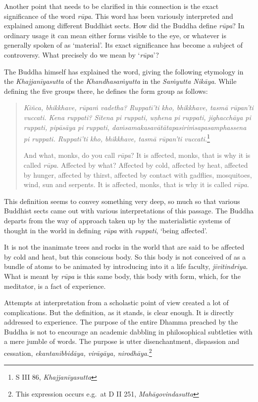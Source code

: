Another point that needs to be clarified in this connection is the exact significance of the word \emph{rūpa}. This word has been variously interpreted and explained among different Buddhist sects. How did the Buddha define \emph{rūpa}? In ordinary usage it can mean either forms visible to the eye, or whatever is generally spoken of as `material'. Its exact significance has become a subject of controversy. What precisely do we mean by `\emph{rūpa}'?

The Buddha himself has explained the word, giving the following etymology in the \emph{Khajjanīyasutta} of the \emph{Khandhasaṁyutta} in the \emph{Saṁyutta Nikāya}. While defining the five groups there, he defines the form group as follows:

\begin{quote}
\emph{Kiñca, bhikkhave, rūpaṁ vadetha? Ruppatī'ti kho, bhikkhave, tasmā rūpan'ti vuccati. Kena ruppati? Sītena pi ruppati, uṇhena pi ruppati, jighacchāya pi ruppati, pipāsāya pi ruppati, daṁsamakasavātātapasiriṁsapasamphassena pi ruppati. Ruppatī'ti kho, bhikkhave, tasmā rūpan'ti vuccati.}\footnote{S III 86, \emph{Khajjanīyasutta}}

And what, monks, do you call \emph{rūpa}? It is affected, monks, that is why it is called \emph{rūpa}. Affected by what? Affected by cold, affected by heat, affected by hunger, affected by thirst, affected by contact with gadflies, mosquitoes, wind, sun and serpents. It is affected, monks, that is why it is called \emph{rūpa}.
\end{quote}

This definition seems to convey something very deep, so much so that various Buddhist sects came out with various interpretations of this passage. The Buddha departs from the way of approach taken up by the materialistic systems of thought in the world in defining \emph{rūpa} with \emph{ruppati}, `being affected'.

It is not the inanimate trees and rocks in the world that are said to be affected by cold and heat, but this conscious body. So this body is not conceived of as a bundle of atoms to be animated by introducing into it a life faculty, \emph{jīvitindriya}. What is meant by \emph{rūpa} is this same body, this body with form, which, for the meditator, is a fact of experience.

Attempts at interpretation from a scholastic point of view created a lot of complications. But the definition, as it stands, is clear enough. It is directly addressed to experience. The purpose of the entire Dhamma preached by the Buddha is not to encourage an academic dabbling in philosophical subtleties with a mere jumble of words. The purpose is utter disenchantment, dispassion and cessation, \emph{ekantanibbidāya, virāgāya, nirodhāya}.\footnote{This expression occurs e.g.~at D II 251, \emph{Mahāgovindasutta}}

